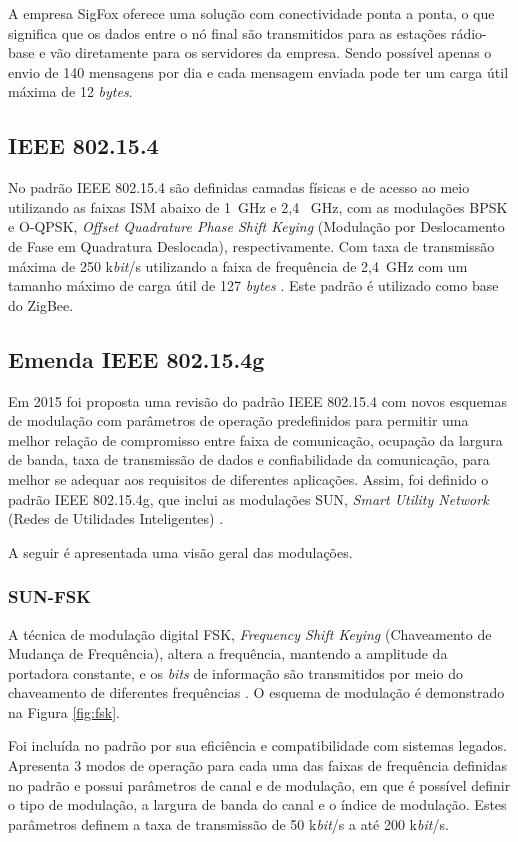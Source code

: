 A empresa SigFox oferece uma solução com conectividade ponta a ponta, o que significa que os dados entre o nó final são transmitidos para as estações rádio-base e vão diretamente para os servidores da empresa. Sendo possível apenas o envio de 140 mensagens por dia e cada mensagem enviada pode ter um carga útil máxima de 12 \emph{bytes}.

\subsection{IEEE 802.15.4}
No padrão IEEE 802.15.4 são definidas camadas físicas e de acesso ao meio utilizando as faixas ISM abaixo de 1~GHz e 2,4 ~GHz, com as modulações BPSK e O-QPSK, \emph{Offset Quadrature Phase Shift Keying} (Modulação por Deslocamento de Fase em Quadratura Deslocada), respectivamente. Com taxa de transmissão máxima de 250 k\emph{bit}/s utilizando a faixa de frequência de 2,4~GHz com um tamanho máximo de carga útil de 127 \emph{bytes} \cite{munoz2018overview} \cite{gomes2017estimaccao}. Este padrão é utilizado como base do ZigBee.

\subsection{Emenda IEEE 802.15.4g}
Em 2015 foi proposta uma revisão do padrão IEEE 802.15.4 com novos esquemas de modulação com parâmetros de operação predefinidos para permitir uma melhor relação de compromisso entre faixa de comunicação, ocupação da largura de banda, taxa de transmissão de dados e confiabilidade da comunicação, para melhor se adequar aos requisitos de diferentes aplicações. Assim, foi definido o padrão IEEE 802.15.4g, que inclui as modulações SUN, \emph{Smart Utility Network} (Redes de Utilidades Inteligentes) \cite{tuset2020reliability}.

A seguir é apresentada uma visão geral das modulações.

\subsubsection{SUN-FSK}
A técnica de modulação digital FSK, \emph{Frequency Shift Keying} (Chaveamento de Mudança de Frequência), altera a frequência, mantendo a amplitude da portadora constante, e os \emph{bits} de informação são transmitidos por meio do chaveamento de diferentes frequências \cite{lathi2012}. O esquema de modulação é demonstrado na Figura \ref{fig:fsk}.

Foi incluída no padrão por sua eficiência e compatibilidade com sistemas legados. Apresenta 3 modos de operação para cada uma das faixas de frequência definidas no padrão e possui parâmetros de canal e de modulação, em que é possível definir o tipo de modulação, a largura de banda do canal e o índice de modulação. Estes parâmetros definem a taxa de transmissão de 50 k\emph{bit}/s a até 200 k\emph{bit}/s.

